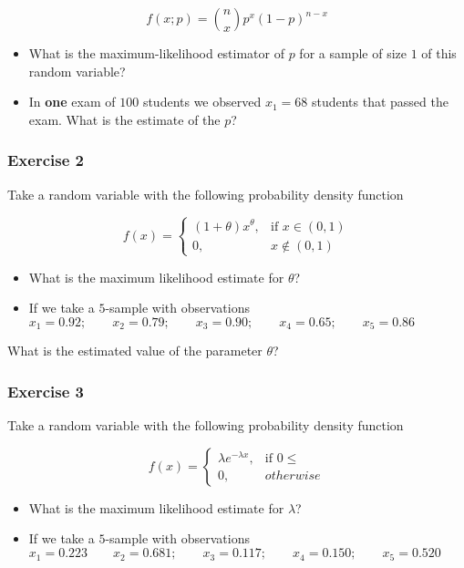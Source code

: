 \documentclass[
]{book}
\begin{document}
\[f(x; p)=\binom n x p^x(1-p)^{n-x}\]

\begin{itemize}
\item
  What is the maximum-likelihood estimator of \(p\) for a sample of size \(1\) of this random variable?
\item
  In \textbf{one} exam of \(100\) students we observed \(x_1=68\) students that passed the exam. What is the estimate of the \(p\)?
\end{itemize}

\hypertarget{exercise-2-7}{%
\subsubsection{Exercise 2}\label{exercise-2-7}}

Take a random variable with the following probability density function

\[
f(x)=
\begin{cases}
    (1+\theta)x^\theta,& \text{if } x\in (0,1)\\
    0,&  x\notin (0,1)
\end{cases}
\]

\begin{itemize}
\item
  What is the maximum likelihood estimate for \(\theta\)?
\item
  If we take a \(5\)-sample with observations
  \(x_1 = 0.92; \qquad x_2 = 0.79; \qquad x_3 = 0.90; \qquad x_4 = 0.65; \qquad x_5 = 0.86\)
\end{itemize}

What is the estimated value of the parameter \(\theta\)?

\hypertarget{exercise-3-4}{%
\subsubsection{Exercise 3}\label{exercise-3-4}}

Take a random variable with the following probability density function

\[
    f(x)= 
\begin{cases}
    \lambda e^{-\lambda x},& \text{if } 0 \leq\\
    0,& otherwise 
\end{cases}
\]

\begin{itemize}
\item
  What is the maximum likelihood estimate for \(\lambda\)?
\item
  If we take a \(5\)-sample with observations
  \(x_1 = 0.223 \qquad x_2 = 0.681; \qquad x_3 = 0.117; \qquad x_4 = 0.150; \qquad x_5 = 0.520\)
\end{itemize}
\end{document}
